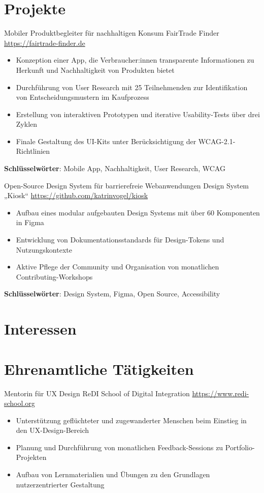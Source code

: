 \documentclass[a4paper, serif, 10pt]{moderncv}
\begin{document}
\section{Projekte}

        {Mobiler Produktbegleiter für nachhaltigen Konsum}
        {FairTrade Finder}
        {\url{https://fairtrade-finder.de}}
        {}
        {\begin{itemize}
\item Konzeption einer App, die Verbraucher:innen transparente Informationen zu Herkunft und Nachhaltigkeit von Produkten bietet
\item Durchführung von User Research mit 25 Teilnehmenden zur Identifikation von Entscheidungsmustern im Kaufprozess
\item Erstellung von interaktiven Prototypen und iterative Usability-Tests über drei Zyklen
\item Finale Gestaltung des UI-Kits unter Berücksichtigung der WCAG-2.1-Richtlinien
\end{itemize}
\textbf{Schlüsselwörter}: Mobile App, Nachhaltigkeit, User Research, WCAG}

        {Open-Source Design System für barrierefreie Webanwendungen}
        {Design System „Kiosk“}
        {\url{https://github.com/katrinvogel/kiosk}}
        {}
        {\begin{itemize}
\item Aufbau eines modular aufgebauten Design Systems mit über 60 Komponenten in Figma
\item Entwicklung von Dokumentationsstandards für Design-Tokens und Nutzungskontexte
\item Aktive Pflege der Community und Organisation von monatlichen Contributing-Workshops
\end{itemize}
\textbf{Schlüsselwörter}: Design System, Figma, Open Source, Accessibility}
\section{Interessen}

\section{Ehrenamtliche Tätigkeiten}

        {Mentorin für UX Design}
        {ReDI School of Digital Integration}
        {\url{https://www.redi-school.org}}
        {}
        {\begin{itemize}
\item Unterstützung geflüchteter und zugewanderter Menschen beim Einstieg in den UX-Design-Bereich
\item Planung und Durchführung von monatlichen Feedback-Sessions zu Portfolio-Projekten
\item Aufbau von Lernmaterialien und Übungen zu den Grundlagen nutzerzentrierter Gestaltung
\end{itemize}}
\end{document}
